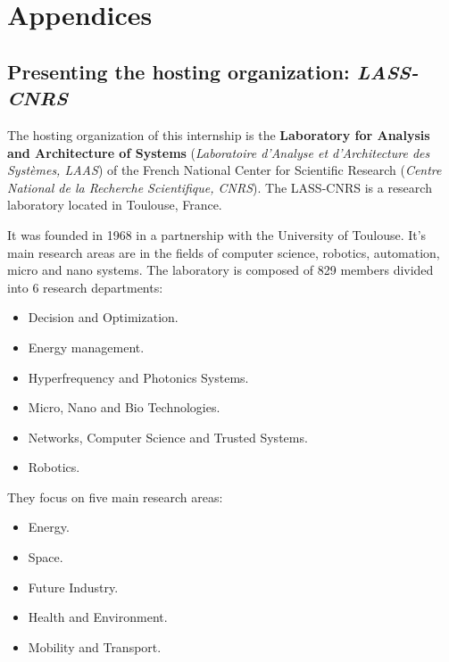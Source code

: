 \chapter*{Appendices}

\begin{appendices}
	\appendix
	\renewcommand{\thesection}{\Alph{section}}

	\section{Presenting the hosting organization: \textit{LASS-CNRS}}

	The hosting organization of this internship is the \textbf{Laboratory for Analysis and Architecture of Systems}
	(\textit{Laboratoire d'Analyse et d'Architecture des Systèmes, LAAS}) of the French National Center for Scientific
	Research (\textit{Centre National de la Recherche Scientifique, CNRS}). The LASS-CNRS is a research laboratory
	located in Toulouse, France.

	It was founded in 1968 in a partnership with the University of Toulouse. It's main research areas are in the fields
	of computer science, robotics, automation, micro and nano systems. The laboratory is composed of 829 members divided
	into 6 research departments:

	\begin{itemize}
		\item Decision and Optimization.
		\item Energy management.
		\item Hyperfrequency and Photonics Systems.
		\item Micro, Nano and Bio Technologies.
		\item Networks, Computer Science and Trusted Systems.
		\item Robotics.
	\end{itemize}

	They focus on five main research areas:

	\begin{itemize}
		\item Energy.
		\item Space.
		\item Future Industry.
		\item Health and Environment.
		\item Mobility and Transport.
	\end{itemize}


\end{appendices}
